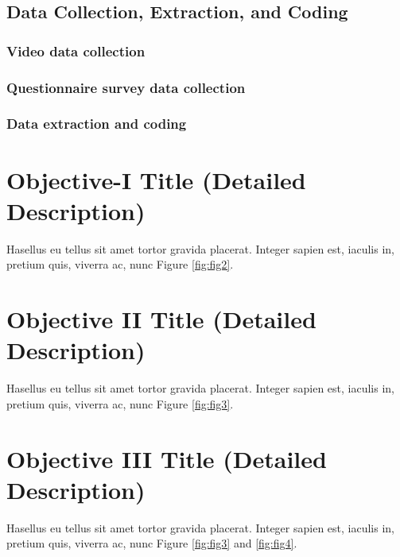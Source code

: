 \documentclass{article}
\begin{document}



\subsection{Data Collection, Extraction, and Coding}
\subsubsection{Video data collection}
\lipsum[1-2]

\subsubsection{Questionnaire survey data collection}
\lipsum[1-4]

\subsubsection{Data extraction and coding}

\lipsum[4-6]


\section{Objective-I Title (Detailed Description)}
Hasellus eu tellus sit amet tortor gravida placerat. Integer sapien est, iaculis in, pretium quis, viverra ac, nunc Figure \ref{fig:fig2}.
\lipsum[1-2]

\lipsum[3-6]






\section{Objective II Title (Detailed Description)}
Hasellus eu tellus sit amet tortor gravida placerat. Integer sapien est, iaculis in, pretium quis, viverra ac, nunc Figure \ref{fig:fig3}.
\lipsum[1-2]

\lipsum[3-6]


\section{Objective III Title (Detailed Description)}
Hasellus eu tellus sit amet tortor gravida placerat. Integer sapien est, iaculis in, pretium quis, viverra ac, nunc Figure \ref{fig:fig3} and \ref{fig:fig4}.
\lipsum[1-2]

\lipsum[3-6]
\end{document}
